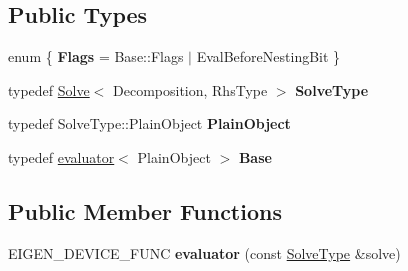 \subsection*{Public Types}
\begin{DoxyCompactItemize}
\item 
\mbox{\label{struct_eigen_1_1internal_1_1evaluator_3_01_solve_3_01_decomposition_00_01_rhs_type_01_4_01_4_a36ee84106de8c58ad14cfa2042089d13}} 
enum \{ {\bfseries Flags} = Base\+::Flags $\vert$ Eval\+Before\+Nesting\+Bit
 \}
\item 
\mbox{\label{struct_eigen_1_1internal_1_1evaluator_3_01_solve_3_01_decomposition_00_01_rhs_type_01_4_01_4_aedd5731a530a41552af8a8887f4d23fa}} 
typedef \mbox{\hyperlink{class_eigen_1_1_solve}{Solve}}$<$ Decomposition, Rhs\+Type $>$ {\bfseries Solve\+Type}
\item 
\mbox{\label{struct_eigen_1_1internal_1_1evaluator_3_01_solve_3_01_decomposition_00_01_rhs_type_01_4_01_4_a7969bd2265149615bc9cc60d720e1360}} 
typedef Solve\+Type\+::\+Plain\+Object {\bfseries Plain\+Object}
\item 
\mbox{\label{struct_eigen_1_1internal_1_1evaluator_3_01_solve_3_01_decomposition_00_01_rhs_type_01_4_01_4_ae033292eca5ee49c08fb3b8c4a27109e}} 
typedef \mbox{\hyperlink{struct_eigen_1_1internal_1_1evaluator}{evaluator}}$<$ Plain\+Object $>$ {\bfseries Base}
\end{DoxyCompactItemize}
\subsection*{Public Member Functions}
\begin{DoxyCompactItemize}
\item 
\mbox{\label{struct_eigen_1_1internal_1_1evaluator_3_01_solve_3_01_decomposition_00_01_rhs_type_01_4_01_4_a48f94f0fa4dbe41b52950740a168c47c}} 
E\+I\+G\+E\+N\+\_\+\+D\+E\+V\+I\+C\+E\+\_\+\+F\+U\+NC {\bfseries evaluator} (const \mbox{\hyperlink{class_eigen_1_1_solve}{Solve\+Type}} \&solve)
\end{DoxyCompactItemize}
